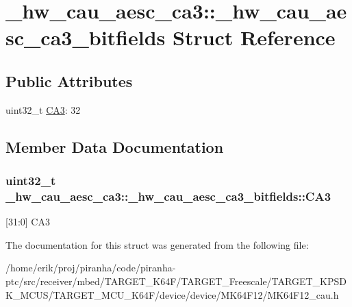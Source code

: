 \hypertarget{struct__hw__cau__aesc__ca3_1_1__hw__cau__aesc__ca3__bitfields}{}\section{\+\_\+hw\+\_\+cau\+\_\+aesc\+\_\+ca3\+:\+:\+\_\+hw\+\_\+cau\+\_\+aesc\+\_\+ca3\+\_\+bitfields Struct Reference}
\label{struct__hw__cau__aesc__ca3_1_1__hw__cau__aesc__ca3__bitfields}
\subsection*{Public Attributes}
\begin{DoxyCompactItemize}
\item 
uint32\+\_\+t \hyperlink{struct__hw__cau__aesc__ca3_1_1__hw__cau__aesc__ca3__bitfields_a02906cb6e9e5a003e269cc946e7cd515}{C\+A3}\+: 32
\end{DoxyCompactItemize}


\subsection{Member Data Documentation}
\subsubsection[{\texorpdfstring{C\+A3}{CA3}}]{\setlength{\rightskip}{0pt plus 5cm}uint32\+\_\+t \+\_\+hw\+\_\+cau\+\_\+aesc\+\_\+ca3\+::\+\_\+hw\+\_\+cau\+\_\+aesc\+\_\+ca3\+\_\+bitfields\+::\+C\+A3}\hypertarget{struct__hw__cau__aesc__ca3_1_1__hw__cau__aesc__ca3__bitfields_a02906cb6e9e5a003e269cc946e7cd515}{}\label{struct__hw__cau__aesc__ca3_1_1__hw__cau__aesc__ca3__bitfields_a02906cb6e9e5a003e269cc946e7cd515}
\mbox{[}31\+:0\mbox{]} C\+A3 

The documentation for this struct was generated from the following file\+:\begin{DoxyCompactItemize}
\item 
/home/erik/proj/piranha/code/piranha-\/ptc/src/receiver/mbed/\+T\+A\+R\+G\+E\+T\+\_\+\+K64\+F/\+T\+A\+R\+G\+E\+T\+\_\+\+Freescale/\+T\+A\+R\+G\+E\+T\+\_\+\+K\+P\+S\+D\+K\+\_\+\+M\+C\+U\+S/\+T\+A\+R\+G\+E\+T\+\_\+\+M\+C\+U\+\_\+\+K64\+F/device/device/\+M\+K64\+F12/M\+K64\+F12\+\_\+cau.\+h\end{DoxyCompactItemize}
